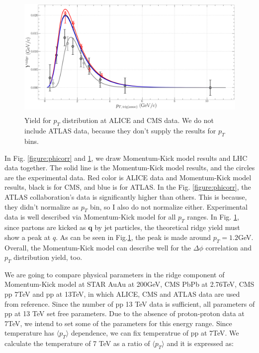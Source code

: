 \documentclass[jkps,fleqn,showpacs,showkeys]{revtex4}
\begin{document}
\begin{figure}[ht]
\centering
\includegraphics[width=12cm, height=6cm]{./Figures/Paper_pTdis}
\caption{Yield for $p_T$ distribution at ALICE and CMS data. We do not include ATLAS data, because they don't supply the results for $p_T$ bins.}
\label{figure:pTdis}
\end{figure}

In Fig. \ref{figure:phicorr} and \ref{figure:pTdis}, we draw Momentum-Kick model results and LHC data together.
The solid line is the Momentum-Kick model results, and the circles are the experimental data.
Red color is ALICE data and Momentum-Kick model results, black is for CMS, and blue is for ATLAS.
In the Fig. \ref{figure:phicorr}, the ATLAS collaboration's data is significantly higher than others.
This is because, they didn't normalize as $p_T$ bin, so I also do not normalize either.
Experimental data is well described via Momentum-Kick model for all $p_T$ ranges.
In Fig. \ref{figure:pTdis}, since partons are kicked as $\textbf{q}$ by jet particles, the theoretical ridge yield must show a peak at $q$.
As can be seen in Fig.\ref{figure:pTdis}, the peak is made around $p_T=1.2$GeV.
Overall, the Momentum-Kick model can describe well for the $\Delta\phi$ correlation and $p_T$ distribution yield, too.


We are going to compare physical parameters in the ridge component of Momentum-Kick model at STAR AuAu at 200GeV\cite{Wong_1}, CMS PbPb at 2.76TeV\cite{PbPb}, CMS pp 7TeV\cite{cms} and pp at 13TeV, in which ALICE, CMS and ATLAS data are used from reference\cite{alice, cms, atlas}.
Since the number of pp 13 TeV data is sufficient, all parameters of pp at 13 TeV set free parameters.
Due to the absence of proton-proton data at 7TeV, we intend to set some of the parameters for this energy range.
Since temperature has $\langle p_T \rangle$ dependence, we can fix temperatrue of pp at 7TeV.
We calculate the temperature of 7 TeV as a ratio of $\langle p_T \rangle$ and it is expressed as:
\end{document}
